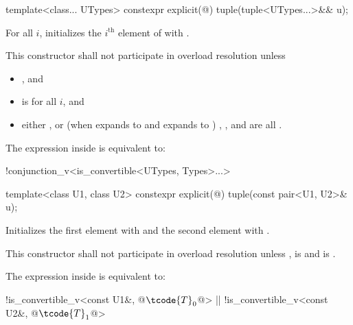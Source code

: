 %
\begin{itemdecl}
template<class... UTypes> constexpr explicit(@\seebelow@) tuple(tuple<UTypes...>&& u);
\end{itemdecl}

\begin{itemdescr}
\pnum
\effects For all $i$,
initializes the $i^\text{th}$ element of  with
.

\pnum
\remarks This constructor shall not participate in overload resolution unless

\begin{itemize}
\item
{} \tcode{==} , and
\item
{} is  for all $i$, and
\item
either
, or
(when  expands to  and  expands to )
, ,
and  are all .
\end{itemize}
The expression inside  is equivalent to:
\begin{codeblock}
!conjunction_v<is_convertible<UTypes, Types>...>
\end{codeblock}
\end{itemdescr}

%
%
\begin{itemdecl}
template<class U1, class U2> constexpr explicit(@\seebelow@) tuple(const pair<U1, U2>& u);
\end{itemdecl}

\begin{itemdescr}
\pnum
\effects Initializes the first element with  and the
second element with .

\pnum
\remarks This constructor shall not participate in overload resolution unless
,
 is  and
 is .

\pnum
The expression inside  is equivalent to:
\begin{codeblock}
!is_convertible_v<const U1&, @$\tcode{T}_0$@> || !is_convertible_v<const U2&, @$\tcode{T}_1$@>
\end{codeblock}
\end{itemdescr}

